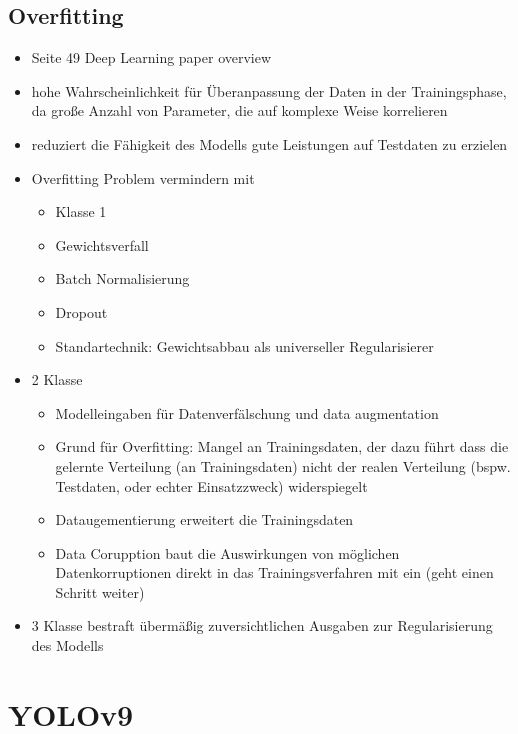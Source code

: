 \subsection{Overfitting}
\begin{itemize}
    \item Seite 49 Deep Learning paper overview
    \item hohe Wahrscheinlichkeit für Überanpassung der Daten in der Trainingsphase, da große Anzahl von Parameter, die auf komplexe Weise korrelieren
    \item reduziert die Fähigkeit des Modells gute Leistungen auf Testdaten zu erzielen 
    \item Overfitting Problem vermindern mit 
    \begin{itemize}
        \item Klasse 1
        \item Gewichtsverfall
        \item Batch Normalisierung
        \item Dropout
        \item Standartechnik: Gewichtsabbau als universeller Regularisierer
    \end{itemize}
    \item 2 Klasse
    \begin{itemize}
        \item Modelleingaben für Datenverfälschung und data augmentation
        \item Grund für Overfitting: Mangel an Trainingsdaten, der dazu führt dass die gelernte Verteilung (an Trainingsdaten) nicht der realen Verteilung (bspw. Testdaten, oder echter Einsatzzweck) widerspiegelt
        \item Dataugementierung erweitert die Trainingsdaten
        \item Data Corupption baut die Auswirkungen von möglichen Datenkorruptionen direkt in das Trainingsverfahren mit ein (geht einen Schritt weiter)
    \end{itemize}
    \item 3 Klasse bestraft übermäßig zuversichtlichen Ausgaben zur Regularisierung des Modells
\end{itemize}







\section{YOLOv9}

